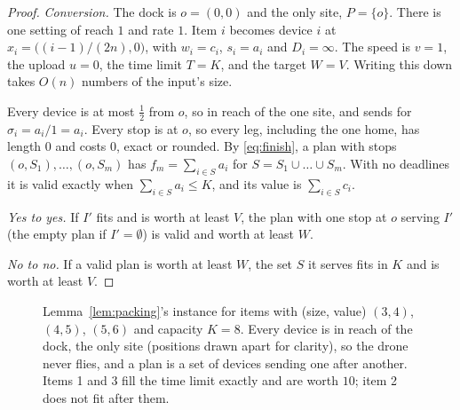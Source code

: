 \begin{proof}
\emph{Conversion.} The dock is $o=(0,0)$ and the only site, $P=\{o\}$.
There is one setting of reach $1$ and rate $1$. Item $i$ becomes device $i$
at $x_i=\bigl((i-1)/(2n),0\bigr)$, with $w_i=c_i$, $s_i=a_i$ and
$D_i=\infty$. The speed is $v=1$, the upload $u=0$, the time limit $T=K$,
and the target $W=V$. Writing this down takes $O(n)$ numbers of the input's
size.

Every device is at most $\tfrac12$ from $o$, so in reach of the one site,
and sends for $\sigma_i=a_i/1=a_i$. Every stop is at $o$, so every leg,
including the one home, has length $0$ and costs $0$, exact or rounded. By
\eqref{eq:finish}, a plan with stops $(o,S_1),\dots,(o,S_m)$ has
$f_m=\sum_{i\in S}a_i$ for $S=S_1\cup\dots\cup S_m$. With no deadlines it is
valid exactly when $\sum_{i\in S}a_i\le K$, and its value is
$\sum_{i\in S}c_i$.

\emph{Yes to yes.} If $I'$ fits and is worth at least $V$, the plan with one
stop at $o$ serving $I'$ (the empty plan if $I'=\emptyset$) is valid and
worth at least $W$.

\emph{No to no.} If a valid plan is worth at least $W$, the set $S$ it
serves fits in $K$ and is worth at least $V$.
\end{proof}

\begin{figure}[t]
  \centering
  \caption{Lemma~\ref{lem:packing}'s instance for items with (size, value)
    $(3,4)$, $(4,5)$, $(5,6)$ and capacity $K=8$. Every device is in reach
    of the dock, the only site (positions drawn apart for clarity), so the
    drone never flies, and a plan is a set of devices sending one after
    another. Items 1 and 3 fill the time limit exactly and are worth $10$;
    item 2 does not fit after them.}
  \label{fig:packing}
\end{figure}

